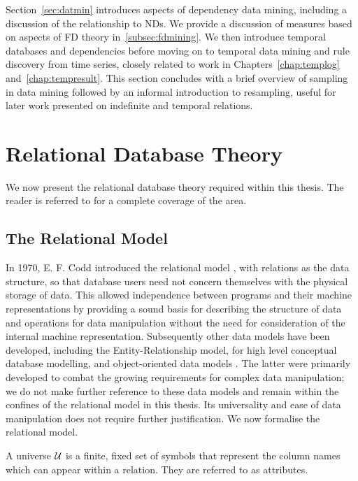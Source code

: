 Section~\ref{sec:datmin} introduces aspects of dependency data mining,
including a discussion of the relationship to NDs. We provide a
discussion of measures based 
on aspects of FD theory in~\ref{subsec:fdmining}. We then introduce
temporal databases and dependencies before moving on to temporal data
mining and rule discovery from time series, closely
related to work in Chapters~\ref{chap:templog} and~\ref{chap:tempresult}.
This section concludes with a brief overview of sampling in data
mining followed by an informal introduction to resampling, useful for
later work presented on indefinite and temporal relations.

\section{Relational Database Theory}\label{sec:relmod}

We now present the relational database theory required within this
thesis. The reader is referred to
\cite{databasefound,atze93,Maier83,Ullm88} for a complete coverage of
the area.

\subsection{The Relational Model}

In 1970, E. F. Codd introduced the relational model \cite{cod70}, with
relations as the data structure,  so
that database users need not concern themselves with the physical
storage of data.  This allowed independence between programs and their
machine representations by providing a sound basis for describing the
structure of data and operations for data manipulation without the
need for consideration of the internal machine
representation. Subsequently other data models have been developed,
including the Entity-Relationship model, for high level conceptual
database modelling, and object-oriented data models
\cite{kim90,databasefound}. The latter were primarily developed to
combat the growing requirements for complex data manipulation; we do
not make further reference to these data models and remain within the
confines of the relational model in this thesis. Its universality and
ease of data 
manipulation does not require further justification. We now formalise the
relational model.

\begin{definition}[Universe]
\begin{rm}
A universe $\cal U$ is a finite, fixed set of symbols that represent the 
column names which can appear within a relation.  They are referred to
as attributes. 
\end{rm} 
\end{definition}

